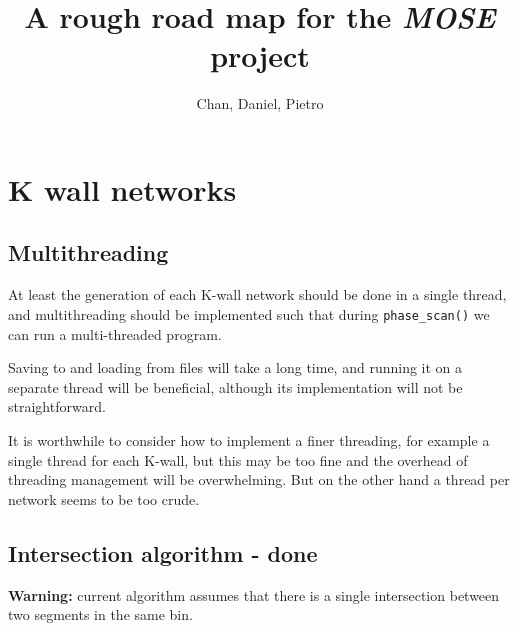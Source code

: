 \documentclass[11pt]{report}
\title{A rough road map for the \emph{MOSE} project}
\author{Chan, Daniel, Pietro}
\begin{document}
\maketitle

\tableofcontents


\chapter{K wall networks}

\section{Multithreading}
At least the generation of each K-wall network should be done in a single thread, and multithreading should be implemented such that during {\tt phase\_scan()} we can run a multi-threaded program.

Saving to and loading from files will take a long time, and running it on a separate thread will be beneficial, although its implementation will not be straightforward.

It is worthwhile to consider how to implement a finer threading, for example a single thread for each K-wall, but this may be too fine and the overhead of threading management will be overwhelming. But on the other hand a thread per network seems to be too crude.

\section{Intersection algorithm  - {\color{red} \bf done}}
{\bf Warning:} current algorithm assumes that there is a single intersection between two segments in the same bin.
\end{document}
